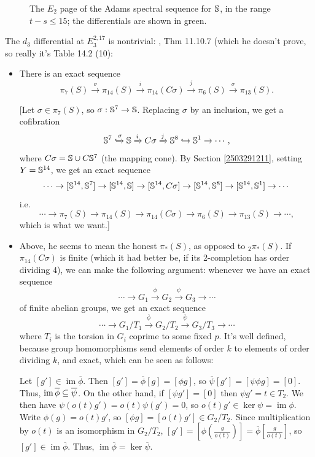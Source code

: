 \documentclass{MetricNotes2023}
\def\bb{\ensuremath\mathbb}
\def\subq{\ensuremath\subseteq}
\def\inj{\ensuremath\hookrightarrow}
\def\xinj{\ensuremath\xhookrightarrow}
\DeclareMathOperator{\im}{im}
\begin{document}
\begin{figure}[H]
\centering

\caption{The \(E_2\) page of the Adams spectral sequence for \(\bb{S}\), in the range \(t-s\leq 15\); the differentials are shown in green.}
\end{figure}

The \(d_3\) differential at \(E^{2, 17}_3\) is nontrivial: \autocite{rognes2}, Thm 11.10.7 (which he doesn't prove, so really it's \autocite{rognes2} Table 14.2 (10): \begin{itemize}
\item There is an exact sequence
\[\pi_7(S) \xrightarrow{\sigma}\pi_{14}(S) \xrightarrow{i}\pi_{14}(C \sigma)\xrightarrow{j}\pi_6(S) \xrightarrow{\sigma}\pi_{13}(S).\]

[Let \(\sigma\in \pi_7(S)\), so \(\sigma : \bb{S}^7 \to \bb{S}\). Replacing \(\sigma\) by an inclusion, we get a cofibration
\[\bb{S}^7 \xinj{\sigma} \bb{S} \xrightarrow{i}C \sigma \xrightarrow{j}\bb{S}^8 \inj \bb{S}^1 \to\cdots,\]
where \(C \sigma= \bb{S}\cup C \bb{S}^7\) (the mapping cone). By Section \ref{2503291211}, setting \(Y=\bb{S}^{14}\), we get an exact sequence
\[\cdots \to [\bb{S}^{14}, \bb{S}^7] \to [\bb{S}^{14}, \bb{S}] \to [\bb{S}^{14}, C \sigma] \to [\bb{S}^{14},\bb{S}^{8}]\to[\bb{S}^{14}, \bb{S}^1]\to \cdots\]
i.e.
\[\cdots \to \pi_{7}(S) \to \pi_{14}(S) \to \pi_{14}(C \sigma) \to \pi_6(S) \to \pi_{13}(S) \to \cdots,\]
which is what we want.]

\item \text{[}Above, he seems to mean the honest \(\pi_*(S)\), as opposed to \(\text{}_2\pi_*(S)\). If \(\pi_{14}(C \sigma)\) is finite (which it had better be, if its 2-completion has order dividing 4), we can make the following argument: whenever we have an exact sequence 
\[\cdots \to G_1 \xrightarrow{\phi} G_2 \xrightarrow{\psi} G_3 \to \cdots\]
of finite abelian groups, we get an exact sequence
\[\cdots \to G_1/T_1 \xrightarrow{\overline\phi} G_2/T_2 \xrightarrow{\overline\psi} G_3/T_3 \to \cdots\]
where \(T_i\) is the torsion in \(G_i\) coprime to some fixed \(p\). It's well defined, because group homomorphisms send elements of order \(k\) to elements of order dividing \(k\), and exact, which can be seen as follows: 

Let \([g']\in \im \overline\phi\). Then \([g']=\overline\phi[g]=[\phi g]\), so \(\overline\psi[g']=[\psi\phi g]=[0]\). Thus, \(\im\overline \phi \subq \overline\psi\). On the other hand, if \([\psi g']=[0]\) then \(\psi g' = t\in T_2\). We then have \(\psi(o(t)g')=o(t)\psi(g')=0\), so \(o(t)g'\in \ker\psi=\im\phi\). Write \(\phi(g)=o(t)g'\), so \([\phi g]=[o(t)g']\in G_2/T_2\). Since multiplication by \(o(t)\) is an isomorphism in \(G_2/T_2\), \([g']=\left[\phi \left(\frac{g}{o(t)}\right)\right]=\overline\phi \left[\frac{g}{o(t)}\right]\), so \([g']\in\im\overline\phi\). Thus, \(\im\overline\phi=\ker\overline\psi\). 


\end{itemize}
\end{document}

